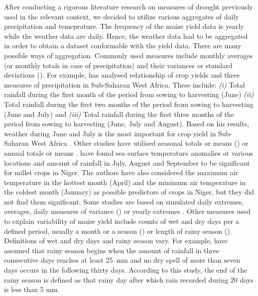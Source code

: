 \documentclass[a4paper,12pt]{article}
\begin{document}
After conducting a rigorous literature research on measures of drought previously used in the relevant context, we decided to utilize various aggregates of daily precipitation and temeprature. The frequency of the maize yield data is yearly while the weather data are daily. Hence, the weather data had to be aggregated in order to obtain a dataset conformable with the yield data. There are many possible ways of aggregation. Commonly used measures include monthly averages (or monthly totals in case of precipitation) and their variances or standard deviations (\citealt{AbrahaSavage2006, LobellEtAl2008, ThorntonEtAl2009}). For example, \cite{Adejuwon2004} has analysed relationship of crop yields and three measures of precipitation in Sub-Saharan West Africa. These include: \textit{(i)} Total rainfall during the first month of the period from sowing to harvesting (June) \textit{(ii)} Total rainfall during the first two months of the period from sowing to harvesting (June and July) and \textit{(iii)} Total rainfall during the first three months of the period from sowing to harvesting (June, July and August). Based on his results, weather during June and July is the most important for crop yield in Sub-Saharan West Africa \citep{Adejuwon2004}. Other studies have utilised seasonal totals or means (\citealt{sagoe2006,LobellBurke2010}) or annual totals or means \citep{BLIGNAUT2009}. \cite{BenMohamed2002} have found sea surface temperature anomalies at various locations and amount of rainfall in July, August and September to be significant for millet crops in Niger. The authors have also considered the maximum air temperature in the hottest month (April) and the minimum air temperature in the coldest month (January) as possible predictors of crops in Niger, but they did not find them significant. Some studies are based on simulated daily extremes, averages, daily measures of variance  (\citealt{SchulzeEtA1993,Chipanshi2003,AbrahaSavage2006}) or yearly extremes \citep{sagoe2006}. Other measures used to explain variability of maize yield include counts of wet and dry days per a defined period, usually a month or a season (\citealt{BenMohamed2002,AbrahaSavage2006,sagoe2006,Giannakopoulos2009}) or length of rainy season (\citealt{Leemans1993,BenMohamed2002}). Definitions of wet and dry days and rainy season vary. For example, \cite{BenMohamed2002} have assumed that rainy season begins when the amount of rainfall in three consecutive days reaches at least 25~mm and no dry spell of more than seven days occurs in the following thirty days. According to this study, the end of the rainy season is defined as that rainy day after which rain recorded during 20 days is less than 5 mm.
\end{document}
